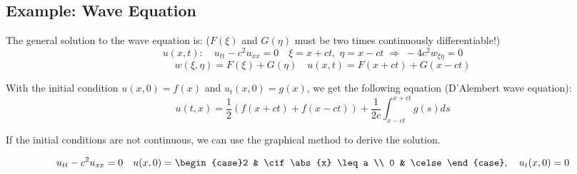 \documentclass[a4paper]{article}
\begin{document}
\begin{twocolumn}

\subsection{Example: Wave Equation}

The general solution to the wave equation is: ($F(\xi)$ and $G(\eta)$ must be two times continuously differentiable!)
$$u(x,t): \quad u_{tt} - c^2 u_{xx} = 0 \quad \xi=x+ct, \; \eta = x-ct \; \Rightarrow \; -4c^2 w_{\xi\eta} = 0 $$
$$\qquad w(\xi,\eta) = F(\xi) + G(\eta) \quad u(x,t) = F(x+ct) + G(x-ct)$$

With the initial condition $u(x,0) = f(x)$ and $u_t(x,0) = g(x)$, we get the following equation (D'Alembert wave equation):
$$u(t,x) = \frac{1}{2} \left(f(x+ct) + f(x-ct)\right) + \frac{1}{2c} \int_{x-ct}^{x+ct}g(s) ds$$

If the initial conditions are not continuous, we can use the graphical method to derive the solution.

$$u_{tt} - c^2 u_{xx} = 0 \quad u(x,0) = \begin{case}2 & \cif \abs{x} \leq a \\ 0 & \celse\end{case}, \quad u_t(x,0) = 0$$


\end{twocolumn}
\end{document}
